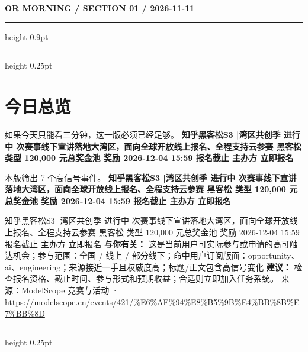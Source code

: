 \documentclass[10.5pt]{ctexart}
\begin{document}
{\small\bfseries OR MORNING / SECTION 01 / 2026-11-11}
\vspace{2mm}
\hrule height 0.9pt
\vspace{1.5mm}
\hrule height 0.25pt
\vspace{4mm}
\section*{今日总览}
{\color{ormuted} 如果今天只能看三分钟，这一版必须已经足够。}
\vspace{2mm}
{\fontsize{25}{29}\selectfont\bfseries 知乎黑客松S3 |湾区共创季 进行中 次赛事线下宣讲落地大湾区，面向全球开放线上报名、全程支持云参赛 黑客松 类型 120,000 元总奖金池 奖励 2026-12-04 15:59 报名截止 主办方 立即报名}\par
\vspace{2mm}
{\large 本版筛出 7 个高信号事件。}
\vspace{3mm}
{\Large\bfseries 知乎黑客松S3 |湾区共创季 进行中 次赛事线下宣讲落地大湾区，面向全球开放线上报名、全程支持云参赛 黑客松 类型 120,000 元总奖金池 奖励 2026-12-04 15:59 报名截止 主办方 立即报名}\par
知乎黑客松S3 |湾区共创季 进行中 次赛事线下宣讲落地大湾区，面向全球开放线上报名、全程支持云参赛 黑客松 类型 120,000 元总奖金池 奖励 2026-12-04 15:59 报名截止 主办方 立即报名
\textbf{与你有关：} 这是当前用户可实际参与或申请的高可触达机会；参与范围：全国 / 线上 / 部分线下；命中用户订阅版面：opportunity、ai、engineering；来源接近一手且权威度高；标题/正文包含高信号变化
\textbf{建议：} 检查报名资格、截止时间、参与形式和预期收益；合适则立即加入任务系统。
{\footnotesize\color{ormuted} 来源：ModelScope 竞赛与活动 · \url{https://modelscope.cn/events/421/%E6%AF%94%E8%B5%9B%E4%BB%8B%E7%BB%8D}}
\vspace{3mm}
\hrule height 0.25pt
\vspace{3mm}
\end{document}
